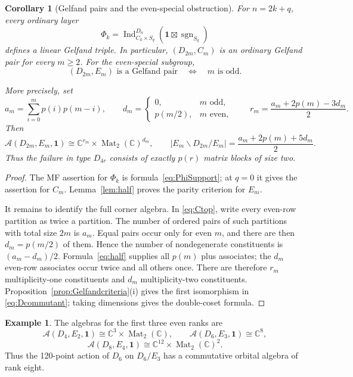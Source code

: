 \documentclass[11pt]{article}
\numberwithin{equation}{section}
\newtheorem{corollary}[theorem]{Corollary}
\theoremstyle{definition}
\newtheorem{example}[theorem]{Example}
\DeclareMathOperator{\Ind}{Ind}
\DeclareMathOperator{\sgn}{sgn}
\newcommand{\C}{\mathbb C}
\newcommand{\one}{\mathbf 1}
\begin{document}
\begin{corollary}[Gelfand pairs and the even-special obstruction]
\label{cor:DGelfand}
For \(n=2k+q\), every ordinary layer
\[
 \Phi_k=
 \Ind_{C_k\times S_q}^{D_n}(\one\boxtimes\sgn_{S_q})
\]
defines a linear Gelfand triple.
In particular, \((D_{2m},C_m)\) is an ordinary Gelfand pair for every
\(m\geq2\).  For the even-special subgroup,
\[
 \boxed{\ (D_{2m},E_m)\text{ is a Gelfand pair}
          \quad\Longleftrightarrow\quad m\text{ is odd}.\ }
\]

More precisely, set
\[
 a_m=\sum_{i=0}^m p(i)p(m-i),\qquad
 d_m=\begin{cases}0,&m\text{ odd},\\p(m/2),&m\text{ even},\end{cases}
 \qquad
 r_m=\frac{a_m+2p(m)-3d_m}{2}.
\]
Then
\begin{equation}
 \mathscr A(D_{2m},E_m,\one)
 \cong \C^{r_m}\times\operatorname{Mat}_2(\C)^{d_m},
 \qquad
 |E_m\backslash D_{2m}/E_m|
 =\frac{a_m+2p(m)+5d_m}{2}.
 \label{eq:Dcommutant}
\end{equation}
Thus the failure in type \(D_{4r}\) consists of exactly \(p(r)\)
matrix blocks of size two.
\end{corollary}
\begin{proof}
The MF assertion for \(\Phi_k\) is formula~\eqref{eq:PhiSupport}; at
\(q=0\) it gives the assertion for \(C_m\).
Lemma~\ref{lem:half} proves the parity criterion for \(E_m\).

It remains to identify the full corner algebra.
In \eqref{eq:Ctop}, write every even-row partition as twice a
partition.  The number of ordered pairs of such partitions with total
size \(2m\) is \(a_m\).  Equal pairs occur only for even \(m\), and
there are then \(d_m=p(m/2)\) of them.  Hence the number of
nondegenerate constituents is \((a_m-d_m)/2\).
Formula~\eqref{eq:half} supplies all \(p(m)\) plus associates; the
\(d_m\) even-row associates occur twice and all others once.
There are therefore \(r_m\) multiplicity-one constituents and
\(d_m\) multiplicity-two constituents.
Proposition~\ref{prop:Gelfandcriteria}(i) gives the first isomorphism
in \eqref{eq:Dcommutant}; taking dimensions gives the double-coset
formula.
\end{proof}

\begin{example}
The algebras for the first three even ranks are
\[
 \mathscr A(D_4,E_2,\one)\cong\C^3\times\operatorname{Mat}_2(\C),
 \qquad
 \mathscr A(D_6,E_3,\one)\cong\C^8,
\]
\[
 \mathscr A(D_8,E_4,\one)
 \cong\C^{12}\times\operatorname{Mat}_2(\C)^2.
\]
Thus the 120-point action of \(D_6\) on \(D_6/E_3\) has a
commutative orbital algebra of rank eight.
\end{example}
\end{document}
